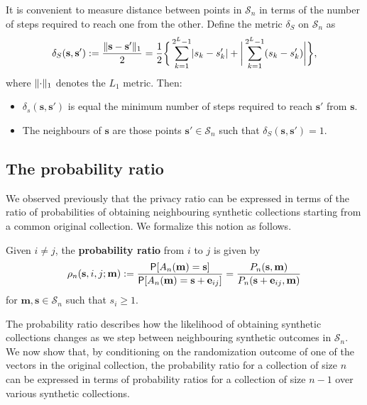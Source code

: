 \documentclass[11pt,draft]{article}
\newcommand{\Ssp}{\mathcal{S}}
\newcommand{\sv}{\mathbf{s}}
\newcommand{\mv}{\mathbf{m}}
\newcommand{\ev}{\mathbf{e}}
\begin{document}
It is convenient to measure distance between points in $\Ssp_n$ in terms of
the number of steps required to reach one from the other.
Define the metric $\delta_S$ on $\Ssp_n$ as
\[ \delta_S(\sv, \sv') := \frac{\norm{\sv - \sv'}_1}{2} =
\frac{1}{2} \bigg\{ \sum_{k = 1}^{2^L-1} \abs{s_k - s'_k} +
\bigg\lvert \sum_{k = 1}^{2^L-1} (s_k - s'_k) \bigg\rvert \bigg\}
, \]
where $\lVert \cdot \rVert_1$ denotes the $L_1$ metric.
Then:
\begin{itemize}
\item $\delta_s(\sv,\sv')$ is equal the minimum number of steps required to
reach $\sv'$ from $\sv$.

\item The neighbours of $\sv$ are those points $\sv' \in \Ssp_n$ such that
$\delta_S(\sv, \sv') = 1$.
\end{itemize}

\subsection{The probability ratio}

We observed previously that the privacy ratio can be expressed in terms of the
ratio of probabilities of obtaining neighbouring synthetic collections starting
from a common original collection.
We formalize this notion as follows.

\begin{defn}
Given $i\neq j$, the \textbf{probability ratio} from $i$ to $j$ is given by
\[ \rho_n(\sv, i, j; \mv) :=
\frac{\P[A_n(\mv) = \sv]}{\P[A_n(\mv) = \sv + \ev_{ij}]} =
\frac{P_n(\sv, \mv)}{P_n(\sv + \ev_{ij},\mv)}
\]
for $\mv,\sv\in\Ssp_n$ such that $s_i \geq 1$.
\end{defn}

The probability ratio describes how the likelihood of obtaining synthetic
collections changes as we step between neighbouring synthetic outcomes in
$\Ssp_n$.
We now show that, by conditioning on the randomization outcome of one of the
vectors in the original collection, the probability ratio for a collection of
size $n$ can be expressed in terms of probability ratios for a collection of
size $n-1$ over various synthetic collections.
\end{document}
